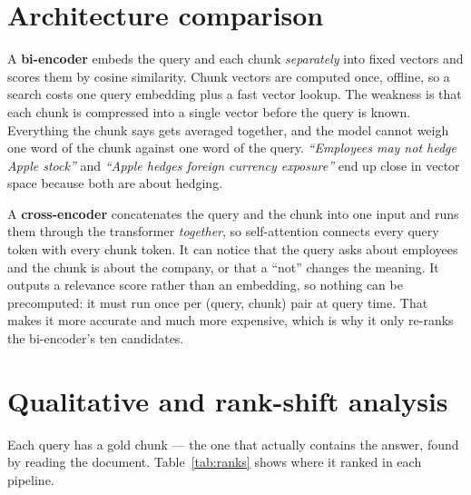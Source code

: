 \documentclass[10pt,a4paper]{article}
\begin{document}
\section{Architecture comparison}

A \textbf{bi-encoder} embeds the query and each chunk \emph{separately} into fixed vectors and
scores them by cosine similarity. Chunk vectors are computed once, offline, so a search costs
one query embedding plus a fast vector lookup. The weakness is that each chunk is compressed
into a single vector before the query is known. Everything the chunk says gets averaged
together, and the model cannot weigh one word of the chunk against one word of the query.
\emph{``Employees may not hedge Apple stock''} and \emph{``Apple hedges foreign currency
exposure''} end up close in vector space because both are about hedging.

A \textbf{cross-encoder} concatenates the query and the chunk into one input and runs them
through the transformer \emph{together}, so self-attention connects every query token with
every chunk token. It can notice that the query asks about employees and the chunk is about
the company, or that a ``not'' changes the meaning. It outputs a relevance score rather than
an embedding, so nothing can be precomputed: it must run once per (query, chunk) pair at
query time. That makes it more accurate and much more expensive, which is why it only
re-ranks the bi-encoder's ten candidates.

\section{Qualitative and rank-shift analysis}

Each query has a gold chunk --- the one that actually contains the answer, found by reading
the document. Table~\ref{tab:ranks} shows where it ranked in each pipeline.
\end{document}
